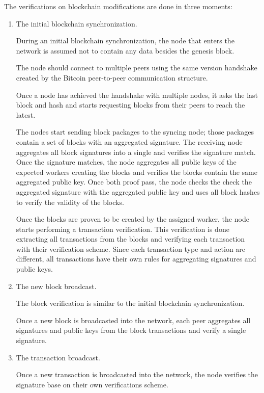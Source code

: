 \documentclass{article}
\begin{document}
	The verifications on blockchain modifications are done in three moments: 
	
		\begin{enumerate}
		\item The initial blockchain synchronization.
		
		During an initial blockchain synchronization, the node that enters the network is assumed not to contain any data besides the genesis block.
		
		The node should connect to multiple peers using the same version handshake created by the Bitcoin peer-to-peer communication structure.
		
		Once a node has achieved the handshake with multiple nodes, it asks the last block and hash and starts requesting blocks from their peers to reach the latest.
		
		The nodes start sending block packages to the syncing node; those packages contain a set of blocks with an aggregated signature. The receiving node aggregates all block signatures into a single and verifies the signature match.  Once the signature matches, the node aggregates all public keys of the expected workers creating the blocks and verifies the blocks contain the same aggregated public key. Once both proof pass, the node checks the check the aggregated signature with the aggregated public key and uses all block hashes to verify the validity of the blocks.
		
		Once the blocks are proven to be created by the assigned worker, the node starts performing a transaction verification. This verification is done extracting all transactions from the blocks and verifying each transaction with their verification scheme. Since each transaction type and action are different, all transactions have their own rules for aggregating signatures and public keys.
		
		\item The new block broadcast.
		
		The block verification is similar to the initial blockchain synchronization.
		
		Once a new block is broadcasted into the network, each peer aggregates all signatures and public keys from the block transactions and verify a single signature.
		
		\item The transaction broadcast.
		
		Once a new transaction is broadcasted into the network, the node verifies the signature base on their own verifications scheme.
		
		\end{enumerate}
															
\end{document}
